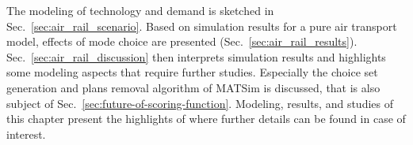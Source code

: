The modeling of technology and demand is sketched in Sec.~\ref{sec:air_rail_scenario}. 
Based on simulation results for a pure air transport model, effects of mode choice are presented (Sec.~\ref{sec:air_rail_results}). 
Sec.~\ref{sec:air_rail_discussion} then interprets simulation results and highlights some modeling aspects that require further studies. 
Especially the choice set generation and plans removal algorithm of MATSim is discussed, that is also subject of Sec.~\ref{sec:future-of-scoring-function}. 
Modeling, results, and studies of this chapter present the highlights of \citet[][Chapter~6, pp.~119]{Grether2014PhD} where further details can be found in case of interest.   



%
%
